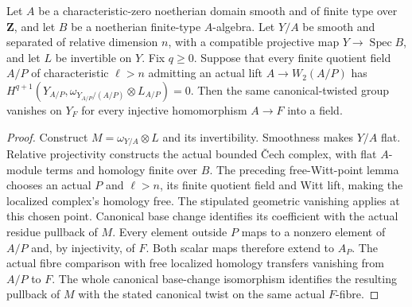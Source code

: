 \begin{theorem}
\label{thm:relative-canonical-produced-witt-specialization}
\leanok
Let $A$ be a characteristic-zero noetherian domain smooth and of finite
type over $\mathbf Z$, and let $B$ be a noetherian finite-type $A$-algebra.
Let $Y/A$ be smooth and separated of relative dimension $n$, with a
compatible projective map $Y\to\operatorname{Spec}B$, and let $L$ be
invertible on $Y$. Fix $q\geq0$. Suppose that every finite quotient field
$A/P$ of characteristic $\ell>n$ admitting an actual lift
$A\to W_2(A/P)$ has
$H^{q+1}(Y_{A/P},\omega_{Y_{A/P}/(A/P)}\otimes L_{A/P})=0$.
Then the same canonical-twisted group vanishes on $Y_F$ for every
injective homomorphism $A\to F$ into a field.
\end{theorem}
\begin{proof}
Construct $M=\omega_{Y/A}\otimes L$ and its invertibility. Smoothness makes
$Y/A$ flat. Relative projectivity constructs the actual bounded Čech
complex, with flat $A$-module terms and homology finite over $B$.
The preceding free-Witt-point lemma chooses an actual $P$ and
$\ell>n$, its finite quotient field and Witt lift, making the localized
complex's homology free. The stipulated geometric vanishing applies at
this chosen point. Canonical base change identifies its coefficient
with the actual residue pullback of $M$.
Every element outside $P$ maps to a nonzero element of $A/P$ and, by
injectivity, of $F$. Both scalar maps therefore extend to $A_P$.
The actual fibre comparison with free localized homology transfers
vanishing from $A/P$ to $F$. The whole canonical base-change isomorphism
identifies the resulting pullback of $M$ with the stated canonical twist
on the same actual $F$-fibre.
\end{proof}

